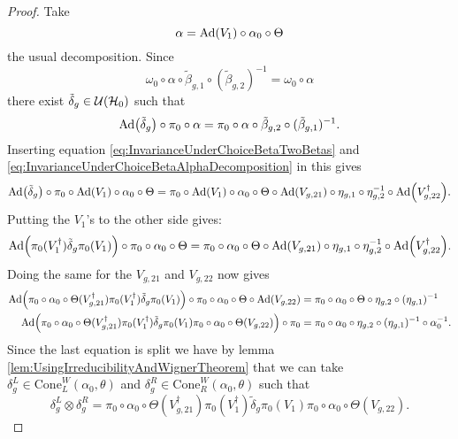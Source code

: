 \documentclass[11pt,a4paper,twoside]{article}
\numberwithin{equation}{section}
\begin{document}
\begin{proof}
	Take 
	\begin{equation}\label{eq:InvarianceUnderChoiceBetaAlphaDecomposition}
		\alpha=\Ad{V_1}\circ\alpha_{0}\circ\Theta
	\end{equation}
	the usual decomposition. Since
	\begin{equation}
		\omega_0\circ\alpha\circ\tilde{\beta}_{g,1}\circ(\tilde{\beta}_{g,2})^{-1}=\omega_0\circ\alpha
	\end{equation}
	there exist $\tilde{\delta}_g\in\mathcal U(\mathcal H_0)$ such that
	\begin{equation}
		\Ad{\tilde{\delta}_g}\circ\pi_0\circ\alpha=\pi_0\circ\alpha\circ\tilde{\beta}_{g,2}\circ(\tilde{\beta}_{g,1})^{-1}.
	\end{equation}
	Inserting equation \eqref{eq:InvarianceUnderChoiceBetaTwoBetas} and \eqref{eq:InvarianceUnderChoiceBetaAlphaDecomposition} in this gives
	\begin{equation}
		\Ad{\tilde{\delta}_g}\circ\pi_0\circ\Ad{V_1}\circ\alpha_0\circ\Theta=\pi_0\circ\Ad{V_1}\circ\alpha_0\circ\Theta\circ\Ad{V_{g,21}}\circ\eta_{g,1}\circ\eta_{g,2}^{-1}\circ\Ad{V_{g,22}^\dagger}.
	\end{equation}
	Putting the $V_1$'s to the other side gives:
	\begin{equation}
		\Ad{\pi_0(V_1^\dagger) \tilde{\delta}_g\pi_0(V_1)}\circ\pi_0\circ\alpha_0\circ\Theta=\pi_0\circ\alpha_0\circ\Theta\circ\Ad{V_{g,21}}\circ\eta_{g,1}\circ\eta_{g,2}^{-1}\circ\Ad{V_{g,22}^\dagger}.
	\end{equation}
	Doing the same for the $V_{g,21}$ and $V_{g,22}$ now gives
	\begin{align}
		\Ad{\pi_0\circ\alpha_0\circ\Theta(V_{g,21}^\dagger)\pi_0(V_1^\dagger)\tilde{\delta}_g\pi_0(V_1)}\circ\pi_0\circ\alpha_0\circ\Theta\circ\Ad{V_{g,22}}&=\pi_0\circ\alpha_0\circ\Theta\circ\eta_{g,2}\circ(\eta_{g,1})^{-1}\\
		\Ad{\pi_0\circ\alpha_0\circ\Theta(V_{g,21}^\dagger)\pi_0(V_1^\dagger)\tilde{\delta}_g\pi_0(V_1)\pi_0\circ\alpha_0\circ\Theta(V_{g,22})}\circ\pi_0&=\pi_0\circ\alpha_0\circ\eta_{g,2}\circ(\eta_{g,1})^{-1}\circ\alpha_0^{-1}.
	\end{align}
	Since the last equation is split we have by lemma \ref{lem:UsingIrreducibilityAndWignerTheorem} that we can take $\delta_g^L\in\textrm{Cone}_L^W(\alpha_0,\theta)$ and $\delta_g^R\in\textrm{Cone}_R^W(\alpha_0,\theta)$ such that
	\begin{equation}
		\delta_g^L\otimes\delta_g^R=\pi_0\circ\alpha_0\circ\Theta(V_{g,21}^\dagger)\pi_0(V_1^\dagger)\tilde{\delta}_g\pi_0(V_1)\pi_0\circ\alpha_0\circ\Theta(V_{g,22}).

\end{equation}
\end{proof}
\end{document}
